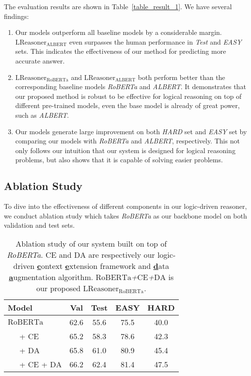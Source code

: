 \documentclass[11pt,a4paper]{article}
\begin{document}
The evaluation results are shown in Table~\ref{table_result_1}. We have several findings:
\begin{enumerate}[-]
    \setlength{\itemsep}{1pt}
    \setlength{\parskip}{1pt}

    \item Our models outperform all baseline models by a considerable margin. \emph{$\text{LReasoner}_{\text{ALBERT}}$} even surpasses the human performance in \emph{Test} and \emph{EASY} sets.
This indicates the effectiveness of our method for predicting more accurate answer.
    
    \item \emph{$\text{LReasoner}_{\text{RoBERTa}}$} and \emph{$\text{LReasoner}_{\text{ALBERT}}$} both perform better than the corresponding baseline models \emph{RoBERTa} and \emph{ALBERT}. It demonstrates that our proposed method is robust to be effective for logical reasoning on top of different pre-trained models, even the base model is already of great power, such as \emph{ALBERT}.
    
    \item Our models generate large improvement on both \emph{HARD} set and \emph{EASY} set by comparing our models
with \emph{RoBERTa} and \emph{ALBERT}, respectively. This not only follows our intuition that our system is designed for logical reasoning problems, but also shows that it is capable of solving easier problems. 
    
\end{enumerate}

\subsection{Ablation Study}
To dive into the effectiveness of different components in our logic-driven reasoner, we conduct ablation study which takes \emph{RoBERTa} as our backbone model on both validation and test sets.
\begin{table}[!th]
    \newcommand{\tabincell}[2]{\begin{tabular}{@{}#1@{}}#2\end{tabular}}
	\centering
	\begin{tabular}{l|cccc}
	\toprule
    \bf Model & \bf Val & \bf Test & \bf EASY & \bf HARD \\
	\midrule
    $\text{RoBERTa}$ & 62.6 & 55.6 & 75.5 & 40.0 \\
    \ \ \ + $\text{CE}$ & 65.2 & 58.3 & 78.6 & 42.3 \\
    \ \ \ + $\text{DA}$ & 65.8 & 61.0 & 80.9 & 45.4 \\
    \ \ \ + $\text{CE}$ + $\text{DA}$ & 66.2 & 62.4 & 81.4 & 47.5 \\
	\bottomrule
 	\end{tabular}
	\caption{Ablation study of our system built on top of \emph{RoBERTa}. \emph{$\text{CE}$} and \emph{$\text{DA}$} are respectively our logic-driven \underline{\bf c}ontext \underline{\bf e}xtension framework and \underline{\bf d}ata \underline{\bf a}ugmentation algorithm. \emph{$\text{RoBERTa}$+$\text{CE}$+$\text{DA}$} is our proposed \emph{$\text{LReasoner}_{\text{RoBERTa}}$}.}
	\label{table_ablation}
\end{table}
\end{document}
